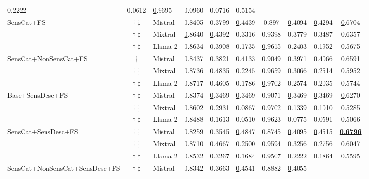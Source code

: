 \begin{table*}[!h]
\begin{tabular}{@{}lclccccccc@{}}
  0.2222 &
  0.0612 &
  {\ul 0.9695} &
  0.0960 &
  0.0716 &
  0.5154 \\ \cmidrule(l){3-10}
\multirow{3}{*}{SensCat+FS} &
  $\dagger$ $\ddagger$ &
  Mistral &
  0.8405 &
  0.3799 &
  {\ul 0.4439} &
  0.897 &
  {\ul 0.4094} &
  {\ul 0.4294} &
  {\ul 0.6704} \\
 &
  $\dagger$ $\ddagger$ &
  Mixtral &
  {\ul 0.8640} &
  {\ul 0.4392} &
  0.3316 &
  0.9398 &
  0.3779 &
  0.3487 &
  0.6357 \\
 &
  $\dagger$ $\ddagger$ &
  Llama 2 &
  0.8634 &
  0.3908 &
  0.1735 &
  {\ul 0.9615} &
  0.2403 &
  0.1952 &
  0.5675 \\ \cmidrule(l){3-10}
\multirow{3}{*}{SensCat+NonSensCat+FS} &
  $\dagger$ \hspace{0.46em} &
  Mistral &
  0.8437 &
  0.3821 &
  {\ul 0.4133} &
  0.9049 &
  {\ul 0.3971} &
  {\ul 0.4066} &
  {\ul 0.6591} \\
 &
  $\dagger$ $\ddagger$ &
  Mixtral &
  {\ul 0.8736} &
  {\ul 0.4835} &
  0.2245 &
  0.9659 &
  0.3066 &
  0.2514 &
  0.5952 \\
 &
  $\dagger$ $\ddagger$ &
  Llama 2 &
  0.8717 &
  0.4605 &
  0.1786 &
  {\ul 0.9702} &
  0.2574 &
  0.2035 &
  0.5744 \\ \cmidrule(l){3-10}
\multirow{3}{*}{Base+SensDesc+FS} &
  $\dagger$ $\ddagger$ &
  Mistral &
  0.8374 &
  {\ul 0.3469} &
  {\ul 0.3469} &
  0.9071 &
  {\ul 0.3469} &
  {\ul 0.3469} &
  {\ul 0.6270} \\
 &
  $\dagger$ $\ddagger$ &
  Mixtral &
  {\ul 0.8602} &
  0.2931 &
  0.0867 &
  {\ul 0.9702} &
  0.1339 &
  0.1010 &
  0.5285 \\
 &
  $\dagger$ $\ddagger$ &
  Llama 2 &
  0.8488 &
  0.1613 &
  0.0510 &
  0.9623 &
  0.0775 &
  0.0591 &
  0.5066 \\ \cmidrule(l){3-10}
\multirow{3}{*}{SensCat+SensDesc+FS} &
  $\dagger$ $\ddagger$ &
  Mistral &
  0.8259 &
  0.3545 &
  {\ul 0.4847} &
  0.8745 &
  {\ul 0.4095} &
  {\ul 0.4515} &
  {\ul \textbf{0.6796}} \\
 &
  $\dagger$ $\ddagger$ &
  Mixtral &
  {\ul 0.8710} &
  {\ul 0.4667} &
  0.2500 &
  {\ul 0.9594} &
  0.3256 &
  0.2756 &
  0.6047 \\
 &
  $\dagger$ $\ddagger$ &
  Llama 2 &
  0.8532 &
  0.3267 &
  0.1684 &
  0.9507 &
  0.2222 &
  0.1864 &
  0.5595 \\ \cmidrule(l){3-10}
\multirow{3}{*}{SensCat+NonSensCat+SensDesc+FS} &
  $\dagger$ $\ddagger$ &
  Mistral &
  0.8342 &
  0.3663 &
  {\ul 0.4541} &
  0.8882 &
  {\ul 0.4055} &

\end{tabular}
\end{table*}
